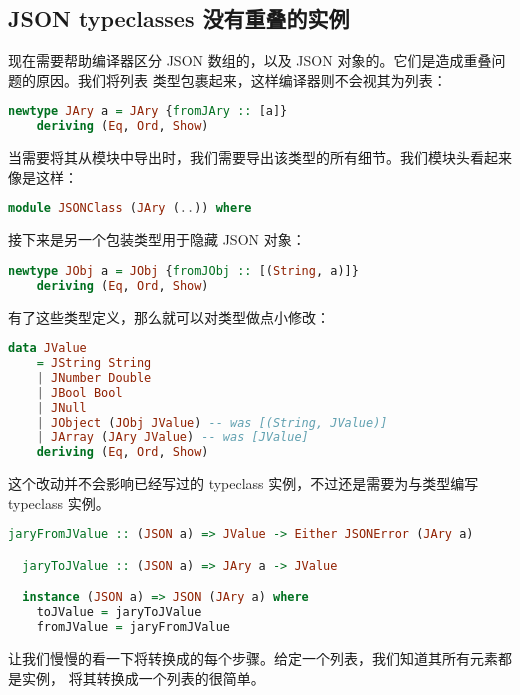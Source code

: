 \documentclass[./main.tex]{subfiles}
\begin{document}
\subsection*{JSON typeclasses 没有重叠的实例}

现在需要帮助编译器区分 JSON 数组的\acode{[a]}，以及 JSON 对象的\acode{[(String,[a])]}。它们是造成重叠问题的原因。我们将列表
类型包裹起来，这样编译器则不会视其为列表：

\begin{lstlisting}[language=Haskell]
  newtype JAry a = JAry {fromJAry :: [a]}
    deriving (Eq, Ord, Show)
\end{lstlisting}

当需要将其从模块中导出时，我们需要导出该类型的所有细节。我们模块头看起来像是这样：

\begin{lstlisting}[language=Haskell]
  module JSONClass (JAry (..)) where
\end{lstlisting}

接下来是另一个包装类型用于隐藏 JSON 对象：

\begin{lstlisting}[language=Haskell]
  newtype JObj a = JObj {fromJObj :: [(String, a)]}
    deriving (Eq, Ord, Show)
\end{lstlisting}

有了这些类型定义，那么就可以对类型做点小修改：

\begin{lstlisting}[language=Haskell]
  data JValue
    = JString String
    | JNumber Double
    | JBool Bool
    | JNull
    | JObject (JObj JValue) -- was [(String, JValue)]
    | JArray (JAry JValue) -- was [JValue]
    deriving (Eq, Ord, Show)
\end{lstlisting}

这个改动并不会影响已经写过的 typeclass 实例，不过还是需要为与类型编写
typeclass 实例。

\begin{lstlisting}[language=Haskell]
  jaryFromJValue :: (JSON a) => JValue -> Either JSONError (JAry a)

  jaryToJValue :: (JSON a) => JAry a -> JValue

  instance (JSON a) => JSON (JAry a) where
    toJValue = jaryToJValue
    fromJValue = jaryFromJValue
\end{lstlisting}

让我们慢慢的看一下将转换成的每个步骤。给定一个列表，我们知道其所有元素都是实例，
将其转换成一个列表的很简单。
\end{document}
